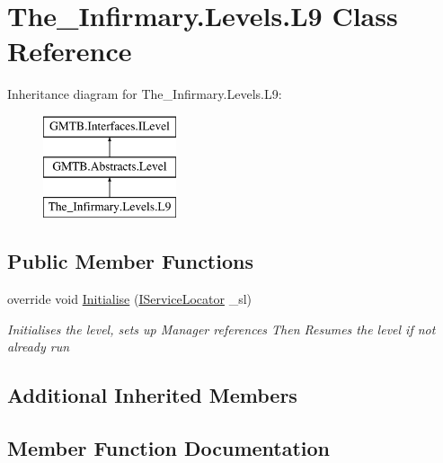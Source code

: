 \hypertarget{class_the___infirmary_1_1_levels_1_1_l9}{}\section{The\+\_\+\+Infirmary.\+Levels.\+L9 Class Reference}
\label{class_the___infirmary_1_1_levels_1_1_l9}
Inheritance diagram for The\+\_\+\+Infirmary.\+Levels.\+L9\+:\begin{figure}[H]
\begin{center}
\leavevmode
\includegraphics[height=3.000000cm]{class_the___infirmary_1_1_levels_1_1_l9}
\end{center}
\end{figure}
\subsection*{Public Member Functions}
\begin{DoxyCompactItemize}
\item 
override void \mbox{\hyperlink{class_the___infirmary_1_1_levels_1_1_l9_a4c00f07d3adeb5fc814f9692efd5adc6}{Initialise}} (\mbox{\hyperlink{interface_g_m_t_b_1_1_interfaces_1_1_i_service_locator}{I\+Service\+Locator}} \+\_\+sl)
\begin{DoxyCompactList}\small\item\em Initialises the level, sets up Manager references Then Resumes the level if not already run \end{DoxyCompactList}\end{DoxyCompactItemize}
\subsection*{Additional Inherited Members}


\subsection{Member Function Documentation}
\mbox{\label{class_the___infirmary_1_1_levels_1_1_l9_a4c00f07d3adeb5fc814f9692efd5adc6}} 
